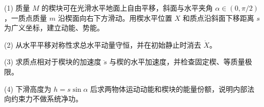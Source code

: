 (1) 质量 \(M\) 的楔块可在光滑水平地面上自由平移，斜面与水平夹角 \(\alpha\in(0,\pi/2)\)，一质点质量 \(m\) 沿楔面向右下方滑动。用楔水平位置 \(X\) 和质点沿斜面下移距离 \(s\) 为广义坐标，建立动能、势能。

(2) 从水平平移对称性求总水平动量守恒，并在初始静止时消去 \(\dot X\)。

(3) 求质点相对于楔块的加速度 \(\ddot s\) 与楔的水平加速度，并检查固定楔、等质量极限。

(4) 下滑高度为 \(h=s\sin\alpha\) 后求两物体运动动能和楔块的能量份额，说明内部法向约束力不做系统净功。

